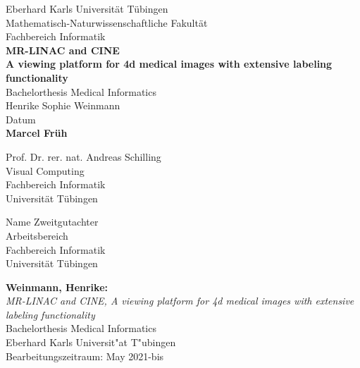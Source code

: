 \documentclass[12pt,a4paper]{report}
\begin{document}

\begin{titlepage}
 \begin{center}
  {\LARGE Eberhard Karls Universität Tübingen}\\
  {\large Mathematisch-Naturwissenschaftliche Fakultät\\
  Fachbereich Informatik\\[2cm]}
  {\Huge\bf  MR-LINAC and CINE\\[1.5cm]}
{\Large\bf A viewing platform for 4d medical images with extensive labeling functionality\\[0.8cm]}
  {\Large Bachelorthesis Medical Informatics\\[3.0cm]}
  {\Large Henrike Sophie Weinmann}\\[0.5cm]
  Datum\\[3cm]
{\small\bf Marcel Früh}\\[1.0cm]
  \parbox{7cm}{\begin{center}{
  	\large Prof. Dr. rer. nat. Andreas Schilling}\\
	  Visual Computing\\
	  Fachbereich Informatik\\
	  Universität Tübingen
	  \end{center}}\hfill\parbox{7cm}{\begin{center}
  {\large Name Zweitgutachter}\\
	  Arbeitsbereich\\
	  Fachbereich Informatik\\
	  Universität Tübingen \end{center}
 }
  \end{center}
\end{titlepage}


\thispagestyle{empty}
\vspace*{\fill}
\begin{minipage}{11.2cm}
\textbf{Weinmann, Henrike:}\\
\emph{MR-LINAC and CINE, A viewing platform for 4d medical images with extensive labeling functionality}\\ Bachelorthesis Medical Informatics\\
Eberhard Karls Universit"at T"ubingen\\
Bearbeitungszeitraum: May 2021-bis
\end{minipage}
\newpage
\end{document}
